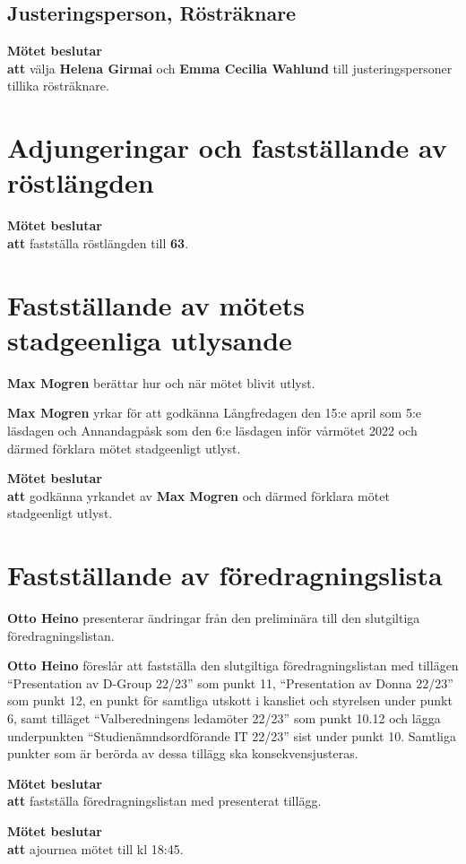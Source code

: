 \documentclass{datateknologsektionen-document}
\newcommand{\ind}{\hspace*{2em}}
\newcommand{\motetbeslutar}{\textbf{Mötet beslutar}}
\newcommand{\att}{\\\ind\textbf{att}}
\begin{document}
\subsection{Justeringsperson, Rösträknare}
\motetbeslutar\att{} välja \textbf{Helena Girmai} och \textbf{Emma Cecilia Wahlund} till justeringspersoner tillika rösträknare.




\section{Adjungeringar och fastställande av röstlängden}
\motetbeslutar
\att{} fastställa röstlängden till \textbf{63}.



\section{Fastställande av mötets stadgeenliga utlysande}
\textbf{Max Mogren} berättar hur och när mötet blivit utlyst.

\textbf{Max Mogren} yrkar för att godkänna Långfredagen den 15:e april som 5:e läsdagen och Annandagpåsk som den 6:e läsdagen inför vårmötet 2022 och därmed förklara mötet stadgeenligt utlyst.

\motetbeslutar
\att{} godkänna yrkandet av \textbf{Max Mogren} och därmed förklara mötet stadgeenligt utlyst.



\pagebreak
\section{Fastställande av föredragningslista}
\textbf{Otto Heino} presenterar ändringar från den preliminära till den slutgiltiga föredragningslistan.

\textbf{Otto Heino} föreslår att fastställa den slutgiltiga föredragningslistan med tillägen ``Presentation av D-Group 22/23'' som punkt 11, ``Presentation av Donna 22/23'' som punkt 12, en punkt för samtliga utskott i kansliet och styrelsen under punkt 6, samt tilläget ``Valberedningens ledamöter 22/23'' som punkt 10.12 och lägga underpunkten ``Studienämndsordförande IT 22/23'' sist under punkt 10. Samtliga punkter som är berörda av dessa tillägg ska konsekvensjusteras.

\motetbeslutar\att{} fastställa föredragningslistan med presenterat tillägg.

\motetbeslutar\att{} ajournea mötet till kl 18:45.
\end{document}
